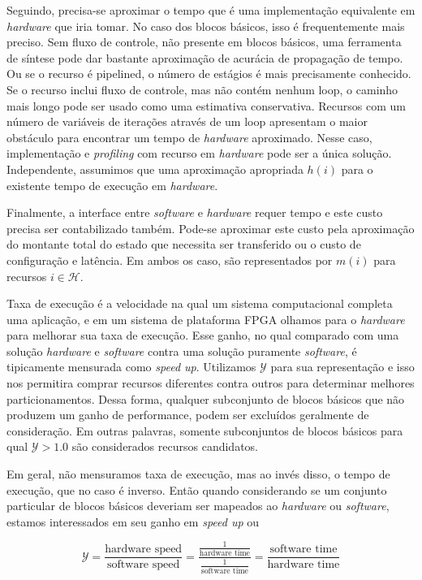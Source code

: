 Seguindo, precisa-se aproximar o tempo que é uma implementação equivalente em \textit{hardware} que iria tomar. No caso dos blocos básicos, isso é frequentemente mais preciso. Sem fluxo de controle, não presente em blocos básicos, uma ferramenta de síntese pode dar bastante aproximação de acurácia de propagação de tempo. Ou se o recurso é pipelined, o número de estágios é mais precisamente conhecido. Se o recurso inclui fluxo de controle, mas não contém nenhum loop, o caminho mais longo pode ser usado como uma estimativa conservativa. Recursos com um número de variáveis de iterações através de um loop apresentam o maior obstáculo para encontrar um tempo de \textit{hardware} aproximado. Nesse caso, implementação e \textit{profiling} com recurso em \textit{hardware} pode ser a única solução. Independente, assumimos que uma aproximação apropriada $ h(i) $ para o existente tempo de execução em \textit{hardware}.

Finalmente, a interface entre \textit{software} e \textit{hardware} requer tempo e este custo precisa ser contabilizado também. Pode-se aproximar este custo pela aproximação do montante total do estado que necessita ser transferido ou o custo de configuração e latência. Em ambos os caso, são representados por $ m(i) $ para recursos $ i \in \mathcal{H} $.

Taxa de execução é a velocidade na qual um sistema computacional completa uma aplicação, e em um sistema de plataforma FPGA olhamos para o \textit{hardware} para melhorar sua taxa de execução. Esse ganho, no qual comparado com uma solução \textit{hardware} e \textit{software} contra uma solução puramente \textit{software}, é tipicamente mensurada como \textit{speed up}. Utilizamos $ \mathcal{Y} $ para sua representação e isso nos permitira comprar recursos diferentes contra outros para determinar melhores particionamentos. Dessa forma, qualquer subconjunto de blocos básicos que não produzem um ganho de performance, podem ser excluídos geralmente de consideração. Em outras palavras, somente subconjuntos de blocos básicos para qual $ \mathcal{Y} > 1.0 $ são considerados recursos candidatos.

Em geral, não mensuramos taxa de execução, mas ao invés disso, o tempo de execução, que no caso é inverso. Então quando considerando se um conjunto particular de blocos básicos deveriam ser mapeados ao \textit{hardware} ou \textit{software}, estamos interessados em seu ganho em \textit{speed up} ou 

$$ \mathcal{Y} = \frac{\text{hardware speed}}{\text{software speed}} = \frac{\frac{1}{\text{hardware time}}}{\frac{1}{\text{software time}}} = \frac{\text{software time}}{\text{hardware time}} $$

